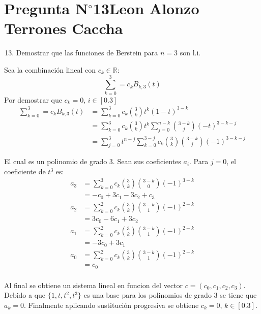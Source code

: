 \section{Pregunta N$^{\circ}$13\qquad Leon Alonzo Terrones Caccha}

\begin{frame}
    \begin{enumerate}\setcounter{enumi}{12}
        \item
            Demostrar que las funciones de Berstein para $n=3$ son l.i.
             
    \end{enumerate}

    \begin{solution}

    Sea la combinación lineal con $c_k\in\mathbb{R}:$
    \[\sum_{k=0}^{3}=c_{k}B_{k,3}(t)\]
    Por demostrar que $c_k=0$, $i\in[0.3]$
    \begin{align*}
        \sum_{k=0}^{3}=c_{k}B_{k,3}(t)&=\sum_{k=0}^{3}c_k\binom{3}{k}t^k(1-t)^{3-k}\\
        &=\sum_{k=0}^{3}{c_k\binom{3}{k}t^k\sum_{j=0}^{n-k}\binom{3-k}{j}{(-t)^{3-k-j}}}\\
        &=\sum_{j=0}^{3}{t^{n-j}\sum_{k=0}^{3-j}{c_k\binom{3}{k}\binom{3-k}{j}(-1)^{3-k-j}}}
    \end{align*}

    El cual es un polinomio de grado 3. Sean sus coeficientes $a_i$.
Para $j=0$, el coeficiente de $t^3$ es:
\begin{align*}
    a_{3}&=\sum_{k=0}^{3}{c_k\binom{3}{k}\binom{3-k}{0}(-1)^{3-k}}\\
    &=-c_0+3c_1-3c_2+c_3\\
    a_{2}&=\sum_{k=0}^{2}{c_k\binom{3}{k}\binom{3-k}{1}(-1)^{2-k}}\\
    &=3c_0-6c_1+3c_2\\
    a_{1}&=\sum_{k=0}^{2}{c_k\binom{3}{k}\binom{3-k}{1}(-1)^{2-k}}\\
    &=-3c_0+3c_1\\
    a_{0}&=\sum_{k=0}^{2}{c_k\binom{3}{k}\binom{3-k}{1}(-1)^{2-k}}\\
    &=c_0\\
\end{align*}


Al final se obtiene un sistema lineal en funcion del vector $c=(c_0,c_1,c_2,c_3)$. Debido a que $\{1,t,t^2,t^3\}$ es una base para los polinomios de grado 3 se tiene que $a_k=0$. Finalmente aplicando sustitución progresiva se obtiene $c_k=0$, $k\in[0.3]$.






\end{solution}
\end{frame}
